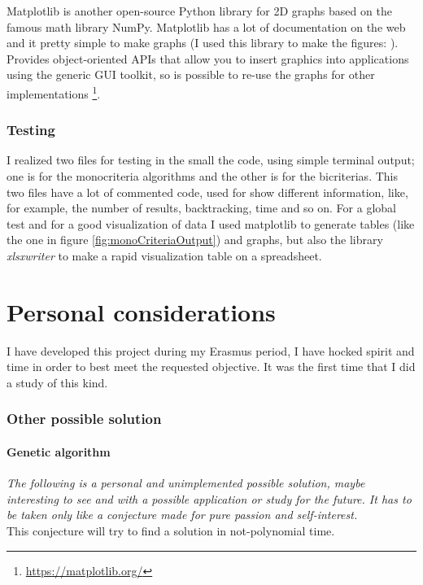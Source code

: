 \documentclass[a4paper,11pt]{report}
\begin{document}
Matplotlib is another open-source Python library for 2D graphs based on the famous math library NumPy. Matplotlib has a lot of documentation on the web and it pretty simple to make graphs (I used this library to make the figures: ).
Provides object-oriented APIs that allow you to insert graphics into applications using the generic GUI toolkit, so is possible to re-use the graphs for other implementations \footnote{\url{https://matplotlib.org/}}.
\subsection{Testing}
I realized two files for testing in the small the code, using simple terminal output; one is for the monocriteria algorithms and the other is for the bicriterias. This two files have a lot of commented code, used for show different information, like, for example, the number of results, backtracking, time and so on. For a global test and for a good visualization of data I used matplotlib to generate tables (like the one in figure \ref{fig:monoCriteriaOutput}) and graphs, but also the library \textit{xlsxwriter} to make a rapid visualization table on a spreadsheet.
\chapter{Personal considerations}
I have developed this project during my Erasmus period, I have hocked spirit and time in order to best meet the requested objective. It was the first time that I did a study of this kind.
\subsection{Other possible solution}
\subsubsection*{Genetic algorithm}
\textit{The following is a personal and unimplemented possible solution, maybe interesting to see and with a possible application or study for the future.
It has to be taken only like a conjecture made for pure passion and self-interest.}
\vspace{10mm}\\
This conjecture will try to find a solution in not-polynomial time.
\end{document}
